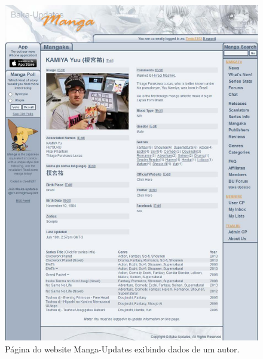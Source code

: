 \documentclass[12pt]{article}
\begin{document}
\begin{figure}[H]
\centering
\includegraphics[width=1\textwidth]{kamiya.pdf}
\caption{Página do website Manga-Updates exibindo dados de um autor.} \label{collection}
\end{figure}
\end{document}
